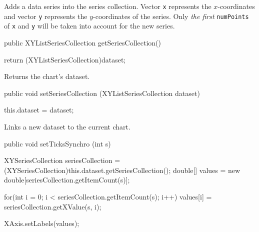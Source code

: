 \begin{tabb}
   Adds a data series into the series collection. Vector \texttt{x} represents
   the $x$-coordinates and vector \texttt{y} represents the $y$-coordinates of
   the series. Only \emph{the first} \texttt{numPoints} of \texttt{x} and
   \texttt{y} will be taken into account for the new series.
\end{tabb}
\begin{htmlonly}
\end{htmlonly}
\begin{code}

   public XYListSeriesCollection getSeriesCollection() \begin{hide} {
      return (XYListSeriesCollection)dataset;
   }\end{hide}
\end{code}
\begin{tabb}
   Returns the chart's dataset.
\end{tabb}
\begin{htmlonly}
\end{htmlonly}
\begin{code}

   public void setSeriesCollection (XYListSeriesCollection dataset) \begin{hide} {
      this.dataset = dataset;
   }\end{hide}
\end{code}
\begin{tabb}
   Links a new dataset to the current chart.
\end{tabb}
\begin{htmlonly}
\end{htmlonly}
\begin{code}

   public void setTicksSynchro (int s) \begin{hide} {
      XYSeriesCollection seriesCollection =
          (XYSeriesCollection)this.dataset.getSeriesCollection();
      double[] values = new double[seriesCollection.getItemCount(s)];

      for(int i = 0; i < seriesCollection.getItemCount(s); i++)
         values[i] = seriesCollection.getXValue(s, i);

      XAxis.setLabels(values);
   }\end{hide}
\end{code}
